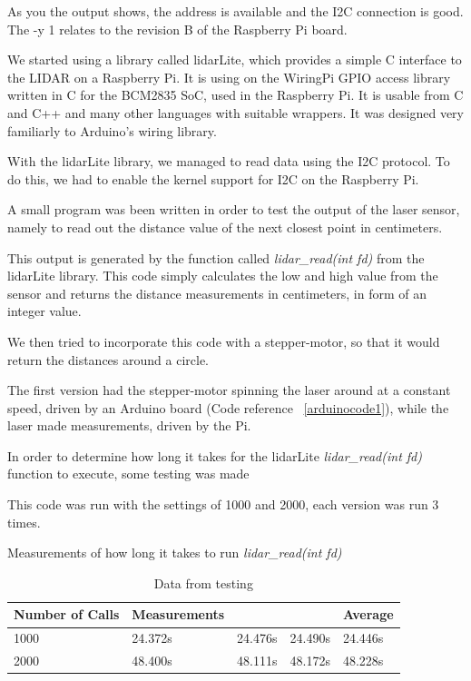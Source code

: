As you the output shows, the address is available and the I2C connection is good. The -y 1 relates to the revision B of the Raspberry Pi board.

We started using a library called lidarLite, which provides a simple C interface to the LIDAR on a Raspberry Pi. It is using on the WiringPi GPIO access library written in C for the BCM2835 SoC, used in the Raspberry Pi. It is usable from C and C++ and many other languages with suitable wrappers. It was designed very familiarly to Arduino's wiring library.

With the lidarLite library\cite{lidarlib}, we managed to read data using the I2C protocol. To do this, we had to enable the kernel support for I2C on the Raspberry Pi\cite{i2csetup}.

A small program was been written in order to test the output of the laser sensor, namely to read out the distance value of the next closest point in centimeters. 


This output is generated by the function called \textit{lidar\_read(int fd)} from the lidarLite library. This code simply calculates the low and high value from the sensor and returns the distance measurements in centimeters, in form of an integer value.



We then tried to incorporate this code with a stepper-motor, so that it would return the distances around a circle.

The first version had the stepper-motor spinning the laser around at a constant speed, driven by an Arduino board (Code reference ~\ref{arduinocode1}), while the laser made measurements, driven by the Pi.

In order to determine how long it takes for the lidarLite \textit{lidar\_read(int fd)} function to execute, some testing was made


This code was run with the settings of 1000 and 2000, each version was run 3 times.

Measurements of how long it takes to run \textit{lidar\_read(int fd)}

\begin{table}[H]
	\centering
	\begin{tabular}{|l|l|l|l|l|} \hline
            Number of Calls & Measurements & & & Average \\ \hline
            1000 & 24.372s & 24.476s & 24.490s & 24.446s \\ \hline
            2000 & 48.400s & 48.111s & 48.172s & 48.228s \\ \hline
	\end{tabular}
	\caption{Data from testing}
\end{table}

